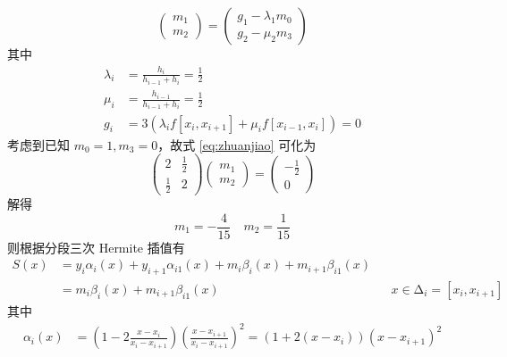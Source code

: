 \documentclass{sjtuarticle}
\begin{document}
\begin{itemize}
\begin{solution}
\begin{itemize}
\begin{equation}
\begin{pmatrix}
                    m_1 \\ m_2
                \end{pmatrix}=
                \begin{pmatrix}
                    g_1-\lambda_1m_0\\
                    g_2-\mu_2m_3
                \end{pmatrix}
            \end{equation}
            其中
            \begin{align*}
                \lambda_i &= \frac{h_i}{h_{i-1}+h_i}=\frac{1}{2} \\
                \mu_i &=\frac{h_{i-1}}{h_{i-1}+h_i}=\frac{1}{2} \\
                g_i &= 3(\lambda_if[x_i,x_{i+1}]+\mu_{i}f[x_{i-1},x_i])=0
            \end{align*}
            考虑到已知 $m_0=1,m_3=0$，故式 \eqref{eq:zhuanjiao} 可化为
            \begin{equation*}
                \begin{pmatrix}
                    2 & \frac{1}{2} \\
                    \frac12 & 2
                \end{pmatrix}
                \begin{pmatrix}
                    m_1 \\ m_2
                \end{pmatrix}=
                \begin{pmatrix}
                    -\frac12\\
                    0
                \end{pmatrix}
            \end{equation*}
            解得
            \begin{equation*}
                m_1=-\frac{4}{15}\quad m_2=\frac{1}{15}
            \end{equation*}
            则根据分段三次 Hermite 插值有
            \begin{align*}
                S(x)&=y_i\alpha_i(x)+y_{i+1}\alpha_{i1}(x)+m_i\beta_i(x)+m_{i+1}\beta_{i1}(x) \\
                &=m_i\beta_i(x)+m_{i+1}\beta_{i1}(x) &&x\in\increment_i=[x_i,x_{i+1}]
            \end{align*}
            其中
            \begin{align*}
                \alpha_i(x)&=\left(1-2\frac{x-x_i}{x_i-x_{i+1}}\right)\left(\frac{x-x_{i+1}}{x_i-x_{i+1}}\right)^2=(1+2(x-x_i))(x-x_{i+1})^2 \\

\end{align*}
\end{itemize}
\end{solution}
\end{itemize}
\end{document}
